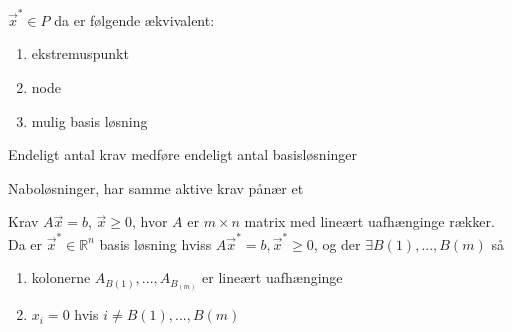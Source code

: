     

\begin{stn}
$\vec{x}^* \in P$ da er følgende ækvivalent:
\begin{enumerate}[label=(\alph*)]
\item ekstremuspunkt
 \item node
 \item mulig basis løsning
\end{enumerate}
\end{stn}


\begin{kor}
Endeligt antal krav medføre endeligt antal basisløsninger
\end{kor}

\begin{defn}[Naboløsninger]
Naboløsninger, har samme aktive krav pånær et
\end{defn}

\begin{stn}
Krav $A\vec{x}=b$, $\vec{x}\geq 0$, hvor $A$ er $m\times n$ matrix med lineært uafhænginge rækker. Da er $\vec{x}^*\in \mathds{R}^n$  basis løsning hviss $A\vec{x}^*=b, \vec{x}^* \geq 0$, og der $\exists B(1), ..., B(m)$ så
\begin{enumerate}[label=(\alph*)]
\item kolonerne $A_{B(1)}, ..., A_{B_(m)}$ er lineært uafhænginge
\item $x_i = 0$ hvis $i \neq B(1),...,B(m)$
\end{enumerate}
\end{stn}
